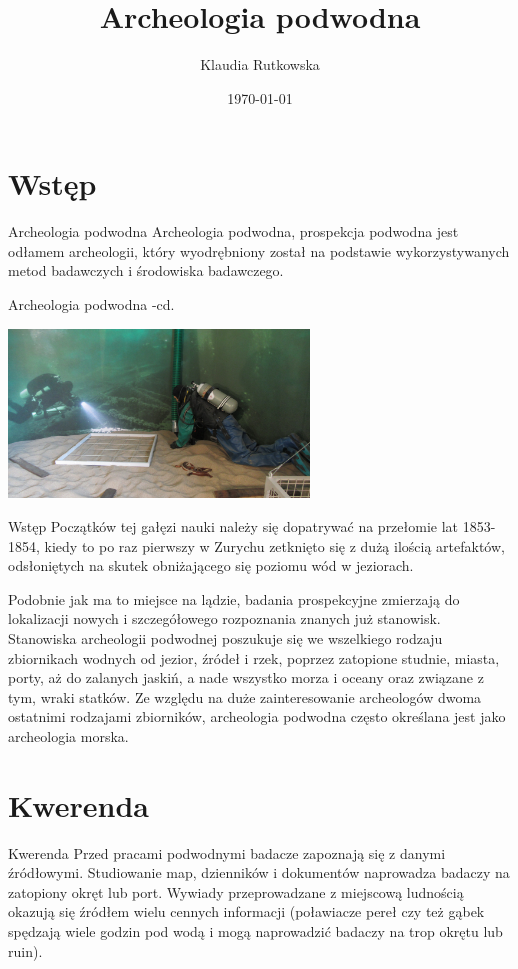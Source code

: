 \documentclass{beamer}
\title{Archeologia podwodna}
\author{Klaudia Rutkowska}
\date{\today}
\institute{UWM}
\begin{document}
\frame{\titlepage}

\section{Wstęp}

\begin{frame}{Archeologia podwodna}
Archeologia podwodna, prospekcja podwodna jest odłamem archeologii, który wyodrębniony został na podstawie wykorzystywanych metod badawczych i środowiska badawczego.
\end{frame}

\begin{frame}{Archeologia podwodna -cd.}
\begin{center}
\includegraphics[width=8cm]{mumin.jpg}
\label{mumin.jpg}
\end{center}
\end{frame}

\begin{frame}{Wstęp}
Początków tej gałęzi nauki należy się dopatrywać na przełomie lat 1853-1854, kiedy to po raz pierwszy w Zurychu zetknięto się z dużą ilością artefaktów, odsłoniętych na skutek obniżającego się poziomu wód w jeziorach.

Podobnie jak ma to miejsce na lądzie, badania prospekcyjne zmierzają do lokalizacji nowych i szczegółowego rozpoznania znanych już stanowisk. Stanowiska archeologii podwodnej poszukuje się we wszelkiego rodzaju zbiornikach wodnych od jezior, źródeł i rzek, poprzez zatopione studnie, miasta, porty, aż do zalanych jaskiń, a nade wszystko morza i oceany oraz związane z tym, wraki statków. Ze względu na duże zainteresowanie archeologów dwoma ostatnimi rodzajami zbiorników, archeologia podwodna często określana jest jako archeologia morska.
\end{frame}

\section{Kwerenda}
\begin{frame}{Kwerenda}
Przed pracami podwodnymi badacze zapoznają się z danymi źródłowymi. Studiowanie map, dzienników i dokumentów naprowadza badaczy na zatopiony okręt lub port. Wywiady przeprowadzane z miejscową ludnością okazują się źródłem wielu cennych informacji (poławiacze pereł czy też gąbek spędzają wiele godzin pod wodą i mogą naprowadzić badaczy na trop okrętu lub ruin).
\end{frame}
\end{document}
